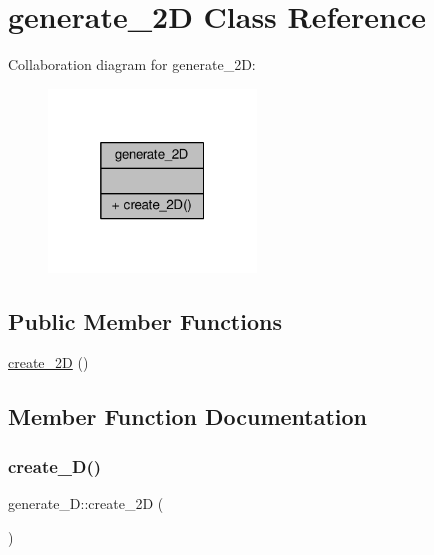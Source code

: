 \hypertarget{classgenerate__2D}{}\section{generate\+\_\+2D Class Reference}
\label{classgenerate__2D}


Collaboration diagram for generate\+\_\+2D\+:
\nopagebreak
\begin{figure}[H]
\begin{center}
\leavevmode
\includegraphics[width=157pt]{classgenerate__2D__coll__graph}
\end{center}
\end{figure}
\subsection*{Public Member Functions}
\begin{DoxyCompactItemize}
\item 
\hyperlink{classgenerate__2D_a8f877568a90f4e5884ff03aa418f1169}{create\+\_\+2D} ()
\end{DoxyCompactItemize}


\subsection{Member Function Documentation}
\mbox{\label{classgenerate__2D_a8f877568a90f4e5884ff03aa418f1169}} 
\subsubsection{\texorpdfstring{create\+\_\+D()}{create\_2D()}}
{\footnotesize\ttfamily generate\+\_\+D\+::create\+\_\+2D (\begin{DoxyParamCaption}{ }\end{DoxyParamCaption})\hspace{0.3cm}{\ttfamily [inline]}}

